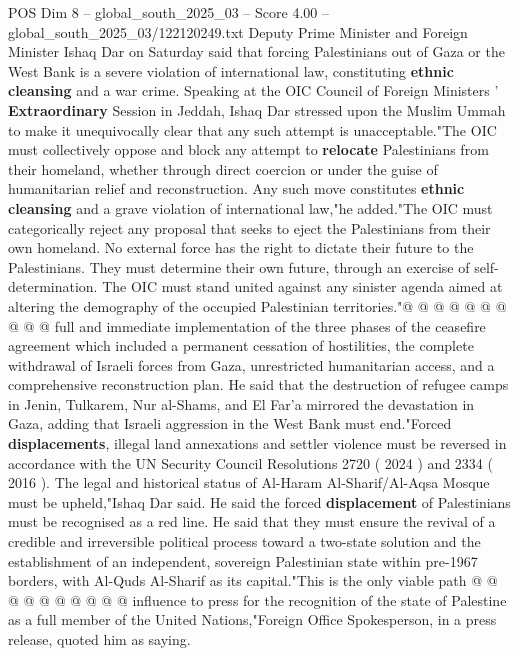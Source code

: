 \begin{textsample}{POS Dim 8 – global\_south\_2025\_03 – Score 4.00 – global\_south\_2025\_03/122120249.txt}  \label{ex:f8_pos_145}
Deputy Prime Minister and Foreign Minister Ishaq Dar on Saturday said that forcing Palestinians out of Gaza or the West Bank is a severe violation of international law, constituting \textbf{ethnic} \textbf{cleansing} and a war crime.
Speaking at the OIC Council of Foreign Ministers ' \textbf{Extraordinary} Session in Jeddah, Ishaq Dar stressed upon the Muslim Ummah to make it unequivocally clear that any such attempt is unacceptable."The OIC must collectively oppose and block any attempt to \textbf{relocate} Palestinians from their homeland, whether through direct coercion or under the guise of humanitarian relief and reconstruction.
Any such move constitutes \textbf{ethnic} \textbf{cleansing} and a grave violation of international law,"he added."The OIC must categorically reject any proposal that seeks to eject the Palestinians from their own homeland.
No external force has the right to dictate their future to the Palestinians.
They must determine their own future, through an exercise of self-determination.
The OIC must stand united against any sinister agenda aimed at altering the demography of the occupied Palestinian territories."@ @ @ @ @ @ @ @ @ @ full and immediate implementation of the three phases of the ceasefire agreement which included a permanent cessation of hostilities, the complete withdrawal of Israeli forces from Gaza, unrestricted humanitarian access, and a comprehensive reconstruction plan.
He said that the destruction of refugee camps in Jenin, Tulkarem, Nur al-Shams, and El Far'a mirrored the devastation in Gaza, adding that Israeli aggression in the West Bank must end."Forced \textbf{displacements}, illegal land annexations and settler violence must be reversed in accordance with the UN Security Council Resolutions 2720 ( 2024 ) and 2334 ( 2016 ).
The legal and historical status of Al-Haram Al-Sharif/Al-Aqsa Mosque must be upheld,"Ishaq Dar said.
He said the forced \textbf{displacement} of Palestinians must be recognised as a red line.
He said that they must ensure the revival of a credible and irreversible political process toward a two-state solution and the establishment of an independent, sovereign Palestinian state within pre-1967 borders, with Al-Quds Al-Sharif as its capital."This is the only viable path @ @ @ @ @ @ @ @ @ @ influence to press for the recognition of the state of Palestine as a full member of the United Nations,"Foreign Office Spokesperson, in a press release, quoted him as saying.

\end{textsample}

